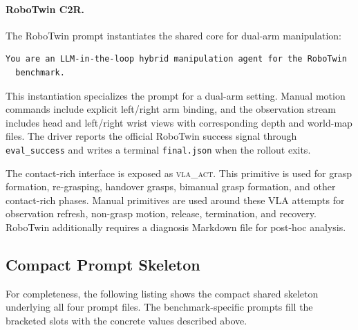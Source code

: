 \documentclass[11pt]{article}
\begin{document}
  \paragraph{RoboTwin C2R.}
  The RoboTwin prompt instantiates the shared core for dual-arm manipulation:

  \begin{lstlisting}[frame=single,framerule=0.5pt]
  You are an LLM-in-the-loop hybrid manipulation agent for the RoboTwin
  benchmark.
  \end{lstlisting}

  This instantiation specializes the prompt for a dual-arm setting. Manual motion
  commands include explicit left/right arm binding, and the observation stream includes
  head and left/right wrist views with corresponding depth and world-map files. The
  driver reports the official RoboTwin success signal through \texttt{eval\_success} and
  writes a terminal \texttt{final.json} when the rollout exits.

  The contact-rich interface is exposed as \textsc{vla\_act}. This primitive is used
  for grasp formation, re-grasping, handover grasps, bimanual grasp
  formation, and other contact-rich phases. Manual primitives are used around these VLA
  attempts for observation refresh, non-grasp motion, release, termination, and recovery.
  RoboTwin additionally requires a diagnosis Markdown file for post-hoc analysis.

\subsection{Compact Prompt Skeleton}
\label{app:agent_prompt:skeleton}

For completeness, the following listing shows the compact shared skeleton underlying
all four prompt files. The benchmark-specific prompts fill the bracketed slots with
the concrete values described above.
\end{document}

